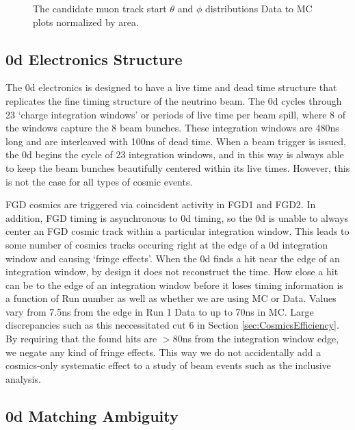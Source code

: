 \begin{figure}[h]
  \caption{The candidate muon track start $\theta$ and $\phi$ distributions 
Data to MC plots normalized by area.} 
  \label{fig:ResultsNormThetaPhi}%
\end{figure}

\clearpage

\subsection{\p0d Electronics Structure}
\label{sec:Appendix_p0delec}

The \p0d electronics is designed to have a live time and dead time structure that replicates the fine timing structure of the neutrino beam. The \p0d cycles through 23 `charge integration windows' or periods of live time per beam spill, where 8 of the windows capture the 8 beam bunches. These integration windows are 480ns long and are interleaved with 100ns of dead time. When a beam trigger is issued, the \p0d begins the cycle of 23 integration windows, and in this way is always able to keep the beam bunches beautifully centered within its live times. However, this is not the case for all types of cosmic events. 

FGD cosmics are triggered via coincident activity in FGD1 and FGD2. In addition, FGD timing is asynchronous to \p0d timing, so the \p0d is unable to always center an FGD cosmic track within a particular integration window. This leads to some number of cosmics tracks occuring right at the edge of a \p0d integration window and causing `fringe effects'. When the \p0d finds a hit near the edge of an integration window, by design it does not reconstruct the time. How close a hit can be to the edge of an integration window before it loses timing information is a function of Run number as well as whether we are using MC or Data. Values vary from 7.5ns from the edge in Run 1 Data to up to 70ns in MC. Large discrepancies such as this neccessitated cut 6 in Section \ref{sec:CosmicsEfficiency}. By requiring that the found hits are $>80$ns from the integration window edge, we negate any kind of fringe effects. This way we do not accidentally add a cosmics-only systematic effect to a study of beam events such as the inclusive analysis. 

\subsection{\p0d Matching Ambiguity}
\label{sec:Appendix_ambig}

